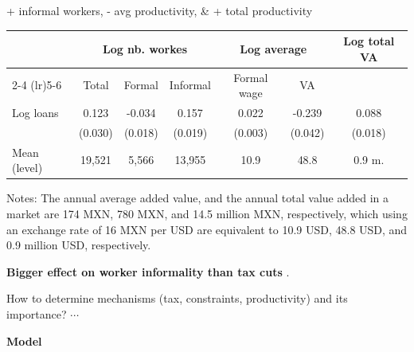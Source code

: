 \documentclass[aspectratio=169]{beamer}
\begin{document}
\begin{frame}{+ informal workers, - avg productivity, \& + total productivity}

\begin{center}
    \begin{tabular}{lcccccc}
    \toprule
     & \multicolumn{3}{c}{Log nb. workes} & \multicolumn{2}{c}{Log average} & \multirow{2}{*}{Log total VA} \\
    \cmidrule(lr){2-4} \cmidrule(lr){5-6}
     & Total & Formal & Informal & Formal wage & VA &  \\
    \midrule
    Log loans 
    & 0.123 & -0.034 & 0.157 & 0.022  & -0.239  & 0.088 \\
    & (0.030) & (0.018) & (0.019) & (0.003) & (0.042) & (0.018) \\
    \midrule
    Mean (level) & 19,521 & 5,566 & 13,955 & 10.9 & 48.8 & 0.9 m. \\
    \bottomrule
\end{tabular}
\begin{tablenotes}[flushleft]
\tiny
\item Notes: The annual average added value, and the annual total value added in a market are 174 MXN, 780 MXN, and 14.5 million MXN, respectively, which using an exchange rate of 16 MXN per USD are equivalent to 10.9 USD, 48.8 USD, and 0.9 million USD, respectively.
\end{tablenotes}
\end{center}
\pause

\textbf{Bigger effect on worker informality than tax cuts}  \textcolor{gray}{\cite{bobba2021labor,rocha2018lower,campos2020effects}}.

\vspace{5mm}

How to determine mechanisms (tax, constraints, productivity) and its importance? $\cdots$ 

\begin{center}
    \Large \textbf{Model}
\end{center}


\end{frame}

\end{document}
